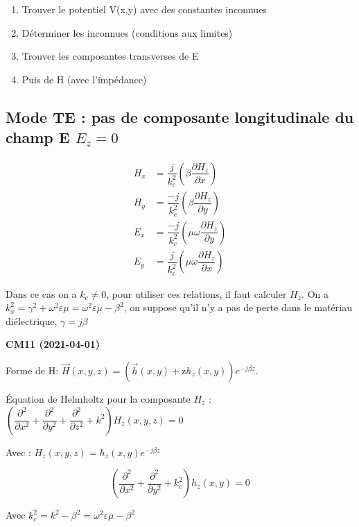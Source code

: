 \documentclass[12pt,a4paper]{report}
\begin{document}
\begin{enumerate}
	\item Trouver le potentiel V(x,y) avec des constantes inconnues
	\item Déterminer les inconnues (conditions aux limites)
	\item Trouver les composantes transverses de E
	\item  Puis de H (avec l'impédance)
\end{enumerate}

\subsection{Mode TE : pas de composante longitudinale du champ E \(E_z = 0\)}

\begin{align*}
	H_x &= \dfrac{j}{k_c^2}\left(\beta \dfrac{\partial H_z}{\partial x} \right)\\
	H_y &= \dfrac{-j}{k_c^2}\left( \beta \dfrac{\partial H_z}{\partial y} \right)\\
	E_x &= \dfrac{-j}{k_c^2}\left(\mu \omega \dfrac{\partial H_z}{\partial y} \right)\\
	E_y &= \dfrac{j}{k_c^2}\left(\mu \omega \dfrac{\partial H_z}{\partial x} \right)
\end{align*}

Dans ce cas on a \(k_c \neq 0\), pour utiliser ces relations, il faut calculer \(H_z\). On a \(k_x^2 = \gamma^2 + \omega^2 \varepsilon \mu = \omega^2 \varepsilon \mu - \beta^2\), on suppose qu'il n'y a pas de perte dans le matériau diélectrique, \(\gamma = j \beta\)

\begin{center}
\textbf{CM11 (2021-04-01)}
\end{center}

Forme de H: \(\vec{H} (x,y,z) = (\vec{h} (x,y) + \text{\^z} h_z(x,y))e^{-j\beta z}\).

Équation de Helmholtz pour la composante \(H_z\) : \(\left ( \dfrac{\partial^2}{\partial x^2} + \dfrac{\partial^2}{\partial y^2} + \dfrac{\partial^2}{\partial z^2} + k^2 \right ) H_z (x,y,z) = 0\)

Avec : \(H_z (x, y, z) = h_z(x,y) e^{-j\beta z}\)

\[
	\left ( \dfrac{\partial^2}{\partial x^2} + \dfrac{\partial^2}{\partial y^2} + k_c^2 \right ) h_z(x,y) = 0
\]

Avec \(k_c^2 = k^2 - \beta^2 = \omega^2 \varepsilon \mu - \beta^2\)
\end{document}
